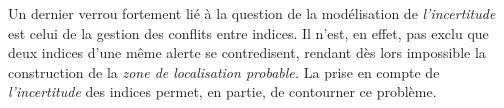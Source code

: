 Un dernier verrou fortement lié à la question de la modélisation de
\emph{l'incertitude} est celui de la gestion des conflits entre
indices. Il n'est, en effet, pas exclu que deux indices d'une même
alerte se contredisent, rendant dès lors impossible la construction de
la \emph{zone de localisation probable.} La prise en compte de
\emph{l'incertitude} des indices permet, en partie, de contourner ce
problème.





